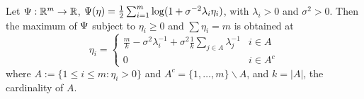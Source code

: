 \begin{proposition}\label{prop:kkt}
  Let $\Psi: \mathbb{R}^m \to \mathbb{R}$, $\Psi(\eta) =
  \frac{1}{2}\sum_{i=1}^m \log (1+\sigma^{-2}\lambda_i \eta_i)$, with
  $\lambda_i > 0$ and $\sigma^{2} > 0$. Then the maximum of $\Psi$
  subject to $\eta_i \geq 0$ and $\sum\eta_i = m$ is obtained at
  \begin{equation}
  \eta_i = \begin{cases}
    \frac{m}{k} - \sigma^2 \lambda_i^{-1} + \sigma^2 \frac{1}{k} \sum_{j\in A} \lambda_j^{-1} & i \in A \\
    0 & i \in A^c
  \end{cases}
  \end{equation}
  where $A:= \{1\leq i \leq m: \eta_i > 0\}$ and $A^c = \{1,\dots, m\}
  \backslash A$, and $k = |A|$, the cardinality of $A$.
\end{proposition}


